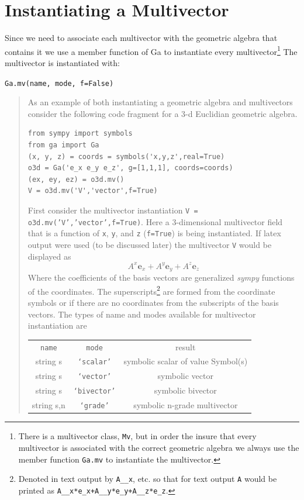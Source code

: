 \documentclass[12pt,twoside,openright]{memoir}
\newcommand{\bm}[1]{\boldsymbol{#1}}
\newcommand{\be}{\begin{equation}}
\newcommand{\ee}{\end{equation}}
\newcommand{\eb}{\bm{e}}
\newcommand{\T}[1]{\texttt{#1}}
\begin{document}
\section{Instantiating a Multivector}

Since we need to associate each multivector with the geometric algebra that contains it
we use a member function of Ga to instantiate every multivector\footnote{There is a
multivector class, \T{Mv}, but in order the insure that every multivector is associated
with the correct geometric algebra we always use the member function \T{Ga.mv} to instantiate
the multivector.}  The multivector is instantiated with:

\T{Ga.mv(name, mode, f=False)}
\begin{quote}
As an example of both instantiating a geometric algebra and multivectors consider the 
following code fragment for a 3-d Euclidian geometric algebra.
\begin{lstlisting}
from sympy import symbols
from ga import Ga
(x, y, z) = coords = symbols('x,y,z',real=True)
o3d = Ga('e_x e_y e_z', g=[1,1,1], coords=coords)
(ex, ey, ez) = o3d.mv()
V = o3d.mv('V','vector',f=True)
\end{lstlisting}	
First consider the multivector instantiation \T{V = o3d.mv('V','vector',f=True)}.  Here
a 3-dimensional multivector field that is a function of \T{x}, \T{y}, and \T{z} (\T{f=True}) is 
being instantiated.  If latex output were used (to be discussed later) the multivector
\T{V} would be displayed as
\be
	A^{x}\eb_{x} + A^{y}\eb_{y} + A^{z}\eb_{z} 
\ee
Where the coefficients of the basis vectors are generalized \emph{sympy} functions of the
coordinates.  The superscripts\footnote{Denoted in text output by \T{A\_\_x}, etc. so
that for text output \T{A} would be printed as \T{A\_\_x*e\_x+A\_\_y*e\_y+A\_\_z*e\_z}.} are formed
from the coordinate symbols or if there are no coordinates from the subscripts of 
the basis vectors.  The types of name and modes available for multivector instantiation are
\begin{center}
   \begin{tabular}{ccc}
    \T{name} &  \T{mode}  &  result \\
         string s &  \T{`scalar'} & symbolic scalar of value Symbol(s) \\
         string s  &\T{`vector'} &  symbolic vector \\
         string s & \T{`bivector'} & symbolic bivector \\ 
         string s,n &  \T{`grade'} & symbolic n-grade multivector \\

\end{tabular}
\end{center}
\end{quote}
\end{document}
